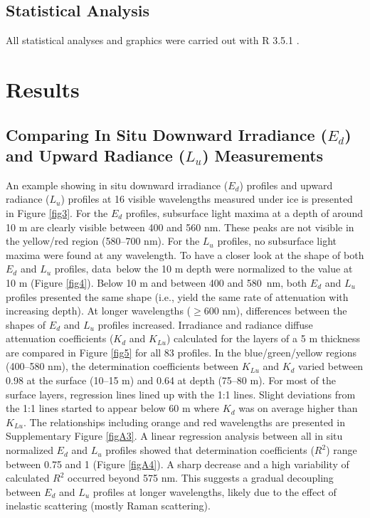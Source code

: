 \documentclass[applsci,article,accept,moreauthors,pdftex,10pt,a4paper]{Definitions/mdpi}
\newcommand{\ked}{\ensuremath{K_{d}}}
\newcommand{\klu}{\ensuremath{K_{Lu}}}
\newcommand{\ed}{\ensuremath{{E_d}}}
\newcommand{\lu}{\ensuremath{{L_u}}}
\newcommand{\rsquared}{\ensuremath{R^2}}
\begin{document}
\subsection{Statistical Analysis}

All statistical analyses and graphics were carried out with R 3.5.1 \citep{RCoreTeam2018}. 
%
\section{Results}
\unskip
\subsection{Comparing In Situ Downward Irradiance (\ed{}) and Upward Radiance (\lu{}) Measurements}

An example showing in situ downward irradiance (\ed{}) profiles and upward radiance (\lu{}) profiles at 16 visible wavelengths measured under ice is presented in Figure \ref{fig3}. For the \ed{} profiles, subsurface light maxima at a depth of around 10 m are clearly visible between 400 and 560 nm. These peaks are not visible in the yellow/red region (580--700 nm). For the \lu{} profiles, no subsurface light maxima were found at any wavelength. To have a closer look at the shape of both \ed{} and \lu{} profiles, data~below the 10 m depth were normalized to the value at 10 m (Figure \ref{fig4}). Below 10 m and between 400 and 580~nm, both \ed{} and \lu{} profiles presented the same shape (i.e., yield the same rate of attenuation with increasing depth). At longer wavelengths ($\ge$600 nm), differences between the shapes of \ed{} and \lu{} profiles increased. Irradiance and radiance diffuse attenuation coefficients (\ked{} and \klu{}) calculated for the layers of a 5 m thickness are compared in Figure \ref{fig5} for all 83 profiles. In the blue/green/yellow regions (400--580 nm), the determination coefficients between \klu{} and \ked{} varied between 0.98 at the surface (10--15 m) and 0.64 at depth (75--80 m). For most of the surface layers, regression lines lined up with the 1:1 lines. Slight deviations from the 1:1 lines started to appear below 60 m where \ked{} was on average higher than \klu{}. The relationships including orange and red wavelengths are presented in Supplementary Figure  \ref{figA3}. A linear regression analysis between all in situ normalized \ed{} and \lu{} profiles showed that determination coefficients (\rsquared{}) range between 0.75 and 1 (Figure  \ref{figA4}). A sharp decrease and a high variability of calculated \rsquared{} occurred beyond 575 nm. This suggests a gradual decoupling between \ed{} and \lu{} profiles at longer wavelengths, likely due to the effect of inelastic scattering (mostly Raman scattering). 
\end{document}
